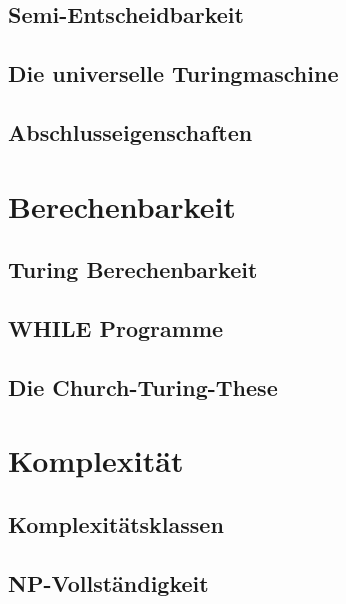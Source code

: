 \documentclass[12pt,a4paper]{article}
\begin{document}
	\subsection{Semi-Entscheidbarkeit}
	
	\subsection{Die universelle Turingmaschine}

	\subsection{Abschlusseigenschaften}

\section{Berechenbarkeit}
	\subsection{Turing Berechenbarkeit}

	\subsection{WHILE Programme}

	\subsection{Die Church-Turing-These}

\section{Komplexität}
	\subsection{Komplexitätsklassen}

	\subsection{NP-Vollständigkeit}
\end{document}

